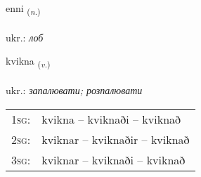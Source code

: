 \documentclass[frontgrid, backgrid]{flacards}\usepackage[]{graphicx}\usepackage[]{xcolor}
\begin{document}
\renewcommand{\flhead}{\vskip5pt \fboxsep=0pt {\small\bfseries\footnotesize Nafnorð | іменник}}
\renewcommand{\fcfoot}{\vskip5pt \fboxsep=0pt \hspace{2pt}{\small\bfseries\footnotesize 3K}}

\renewcommand{\blhead}{\vskip5pt {\small\bfseries\footnotesize Nafnorð | іменник }}
\renewcommand{\bcfoot}{\vskip5pt \hspace{2pt}{\small\bfseries\footnotesize 3K}}


{enni \small{\textsubscript{(\textit{n.})}} \\[1ex] %
\textphonetic{[ɛnɪ]} \\
ukr.: \emph{лоб} \\  [2ex]
\renewcommand*{\arraystretch}{0.8}
}

\renewcommand{\flhead}{\vskip5pt \fboxsep=0pt {\small\bfseries\footnotesize Sagnorð | дієслово}}
\renewcommand{\fcfoot}{\vskip5pt \fboxsep=0pt \hspace{2pt}{\small\bfseries\footnotesize 3K}}

\renewcommand{\blhead}{\vskip5pt {\small\bfseries\footnotesize Sagnorð | дієслово }}
\renewcommand{\bcfoot}{\vskip5pt \hspace{2pt}{\small\bfseries\footnotesize 3K}}


{kvikna \small{\textsubscript{(\textit{v.})}} \\[1ex] %
\textphonetic{[kʰvɪhkna]} \\
ukr.: \emph{запалювати; розпалювати} \\  [2ex]
\renewcommand*{\arraystretch}{0.8}
\begin{tabular}{p{1cm}l}
\textsc{1sg}: & kvikna -- kviknaði -- kviknað \\ 
\textsc{2sg}: & kviknar -- kviknaðir -- kviknað \\ 
\textsc{3sg}: & kviknar -- kviknaði -- kviknað \\ 
\end{tabular}
}
\end{document}
